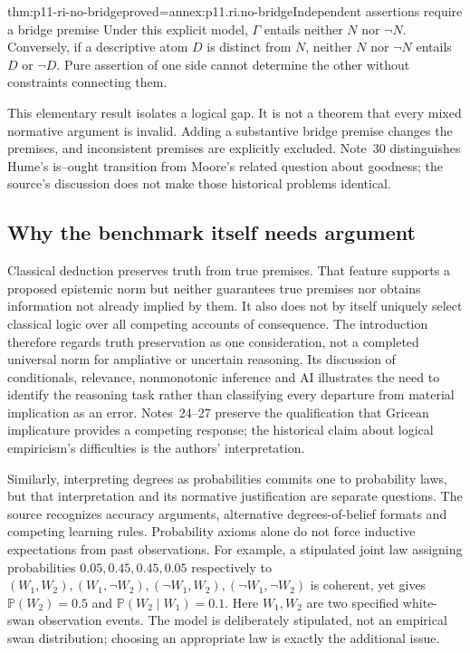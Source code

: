 \begin{hbtheorem}{thm:p11-ri-no-bridge}{proved=annex:p11.ri.no-bridge}{Independent assertions require a bridge premise}
Under this explicit model, \(\Gamma\) entails neither \(N\) nor
\(\neg N\). Conversely, if a descriptive atom \(D\) is distinct
from \(N\), neither \(N\) nor \(\neg N\) entails \(D\) or
\(\neg D\). Pure assertion of one side cannot determine the other
without constraints connecting them.
\end{hbtheorem}

This elementary result isolates a logical gap. It is not a theorem
that every mixed normative argument is invalid. Adding a substantive
bridge premise changes the premises, and inconsistent premises are
explicitly excluded. Note~30 distinguishes Hume's is--ought transition
from Moore's related question about goodness; the source's discussion
does not make those historical problems identical.

\subsection{Why the benchmark itself needs argument}

Classical deduction preserves truth from true premises. That feature
supports a proposed epistemic norm but neither guarantees true premises
nor obtains information not already implied by them. It also does not
by itself uniquely select classical logic over all competing accounts
of consequence. The introduction therefore regards truth preservation
as one consideration, not a completed universal norm for ampliative
or uncertain reasoning. Its discussion of conditionals, relevance,
nonmonotonic inference and AI illustrates the need to identify the
reasoning task rather than classifying every departure from material
implication as an error. Notes~24--27 preserve the qualification that
Gricean implicature provides a competing response; the historical claim
about logical empiricism's difficulties is the authors' interpretation.

Similarly, interpreting degrees as probabilities commits one to
probability laws, but that interpretation and its normative justification
are separate questions. The source recognizes accuracy arguments,
alternative degrees-of-belief formats and competing learning rules.
Probability axioms alone do not force inductive expectations from past
observations. For example, a stipulated joint law assigning probabilities
\(0.05,0.45,0.45,0.05\) respectively to
\((W_1,W_2),(W_1,\neg W_2),(\neg W_1,W_2),
(\neg W_1,\neg W_2)\) is coherent, yet gives
\(\mathbb P(W_2)=0.5\) and
\(\mathbb P(W_2\mid W_1)=0.1\). Here \(W_1,W_2\) are
two specified white-swan observation events. The model is deliberately
stipulated, not an empirical swan distribution; choosing an appropriate
law is exactly the additional issue.

